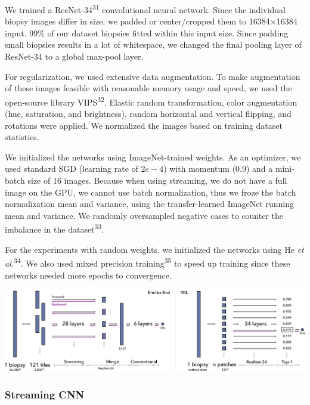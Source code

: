 \documentclass[
  12pt,
  a5,margin=2cmpaper,
]{article}
\begin{document}
We trained a ResNet-34\textsuperscript{31} convolutional neural network.
Since the individual biopsy images differ in size, we padded or
center/cropped them to 16384\(\times\)16384 input. 99\% of our dataset
biopsies fitted within this input size. Since padding small biopsies
results in a lot of whitespace, we changed the final pooling layer of
ResNet-34 to a global max-pool layer.

For regularization, we used extensive data augmentation. To make
augmentation of these images feasible with reasonable memory usage and
speed, we used the open-source library VIPS\textsuperscript{32}. Elastic
random transformation, color augmentation (hue, saturation, and
brightness), random horizontal and vertical flipping, and rotations were
applied. We normalized the images based on training dataset statistics.

We initialized the networks using ImageNet-trained weights. As an
optimizer, we used standard SGD (learning rate of \(2e-4\)) with
momentum (0.9) and a mini-batch size of 16 images. Because when using
streaming, we do not have a full image on the GPU, we cannot use batch
normalization, thus we froze the batch normalization mean and variance,
using the transfer-learned ImageNet running mean and variance. We
randomly oversampled negative cases to counter the imbalance in the
dataset\textsuperscript{33}.

For the experiments with random weights, we initialized the networks
using He \emph{et al.}\textsuperscript{34}. We also used mixed precision
training\textsuperscript{35} to speed up training since these networks
needed more epochs to convergence.

\includegraphics{chpt3_imgs/methods_overview_cropped.png}

\hypertarget{streaming-cnn}{%
\subsubsection{Streaming CNN}\label{streaming-cnn}}
\end{document}
